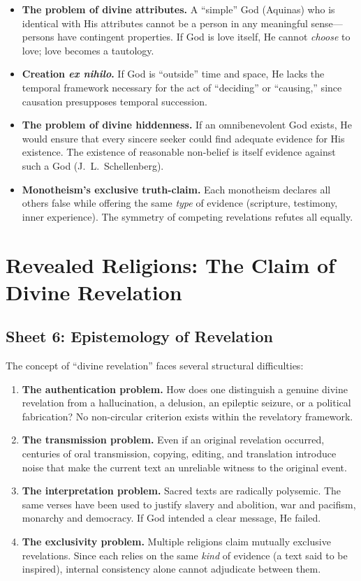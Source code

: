 \begin{itemize}
  \item \textbf{The problem of divine attributes.}
    A ``simple'' God (Aquinas) who is identical with His
    attributes cannot be a person in any meaningful sense---persons have
    contingent properties.  If God is love itself, He cannot \emph{choose}
    to love; love becomes a tautology.
  \item \textbf{Creation \emph{ex nihilo}.}
    If God is ``outside'' time and space, He
    lacks the temporal framework necessary for the act of ``deciding'' or
    ``causing,'' since causation presupposes temporal succession.
  \item \textbf{The problem of divine hiddenness.}
    If an omnibenevolent God exists, He would ensure that every sincere
    seeker could find adequate evidence for His existence.  The existence of
    reasonable non-belief is itself evidence against such a God
    (J.~L.~Schellenberg).
  \item \textbf{Mono\-theism's exclusive truth-claim.}
    Each monotheism declares all others false while offering the same
    \emph{type} of evidence (scripture, testimony, inner experience).  The
    symmetry of competing revelations refutes
    all equally.
\end{itemize}

\section{Revealed Religions: The Claim of Divine Revelation}

\subsection{Sheet 6: Epistemology of Revelation}

The concept of ``divine revelation'' faces several structural difficulties:

\begin{enumerate}
  \item \textbf{The authentication problem.}
    How does one distinguish a genuine divine revelation from a hallucination,
    a delusion, an epileptic seizure, or a
    political fabrication?  No non-circular criterion exists within the
    revelatory framework.
  \item \textbf{The transmission problem.}
    Even if an original revelation occurred, centuries of oral transmission,
    copying, editing, and translation introduce noise that make the current text an unreliable witness to the
    original event.
  \item \textbf{The interpretation problem.}
    Sacred texts are radically polysemic.  The same verses have been used to
    justify slavery and abolition, war and pacifism, monarchy
    and democracy.  If God intended a clear message, He failed.
  \item \textbf{The exclusivity problem.}
    Multiple religions claim mutually exclusive revelations.  Since each
    relies on the same \emph{kind} of evidence (a text said to be inspired),
    internal consistency alone cannot adjudicate between them.
\end{enumerate}

